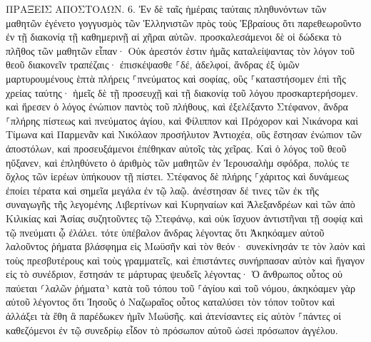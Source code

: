 \documentclass[twoside, 9pt]{extreport}
\begin{document}
ΠΡΑΞΕΙΣ ΑΠΟΣΤΟΛΩΝ.
6.
Ἐν δὲ ταῖς ἡμέραις ταύταις πληθυνόντων τῶν μαθητῶν ἐγένετο γογγυσμὸς τῶν Ἑλληνιστῶν πρὸς τοὺς Ἑβραίους ὅτι παρεθεωροῦντο ἐν τῇ διακονίᾳ τῇ καθημερινῇ αἱ χῆραι αὐτῶν. 
προσκαλεσάμενοι δὲ οἱ δώδεκα τὸ πλῆθος τῶν μαθητῶν εἶπαν· Οὐκ ἀρεστόν ἐστιν ἡμᾶς καταλείψαντας τὸν λόγον τοῦ θεοῦ διακονεῖν τραπέζαις· 
ἐπισκέψασθε ⸀δέ, ἀδελφοί, ἄνδρας ἐξ ὑμῶν μαρτυρουμένους ἑπτὰ πλήρεις ⸀πνεύματος καὶ σοφίας, οὓς ⸀καταστήσομεν ἐπὶ τῆς χρείας ταύτης· 
ἡμεῖς δὲ τῇ προσευχῇ καὶ τῇ διακονίᾳ τοῦ λόγου προσκαρτερήσομεν. 
καὶ ἤρεσεν ὁ λόγος ἐνώπιον παντὸς τοῦ πλήθους, καὶ ἐξελέξαντο Στέφανον, ἄνδρα ⸀πλήρης πίστεως καὶ πνεύματος ἁγίου, καὶ Φίλιππον καὶ Πρόχορον καὶ Νικάνορα καὶ Τίμωνα καὶ Παρμενᾶν καὶ Νικόλαον προσήλυτον Ἀντιοχέα, 
οὓς ἔστησαν ἐνώπιον τῶν ἀποστόλων, καὶ προσευξάμενοι ἐπέθηκαν αὐτοῖς τὰς χεῖρας. 
Καὶ ὁ λόγος τοῦ θεοῦ ηὔξανεν, καὶ ἐπληθύνετο ὁ ἀριθμὸς τῶν μαθητῶν ἐν Ἰερουσαλὴμ σφόδρα, πολύς τε ὄχλος τῶν ἱερέων ὑπήκουον τῇ πίστει. 
Στέφανος δὲ πλήρης ⸀χάριτος καὶ δυνάμεως ἐποίει τέρατα καὶ σημεῖα μεγάλα ἐν τῷ λαῷ. 
ἀνέστησαν δέ τινες τῶν ἐκ τῆς συναγωγῆς τῆς λεγομένης Λιβερτίνων καὶ Κυρηναίων καὶ Ἀλεξανδρέων καὶ τῶν ἀπὸ Κιλικίας καὶ Ἀσίας συζητοῦντες τῷ Στεφάνῳ, 
καὶ οὐκ ἴσχυον ἀντιστῆναι τῇ σοφίᾳ καὶ τῷ πνεύματι ᾧ ἐλάλει. 
τότε ὑπέβαλον ἄνδρας λέγοντας ὅτι Ἀκηκόαμεν αὐτοῦ λαλοῦντος ῥήματα βλάσφημα εἰς Μωϋσῆν καὶ τὸν θεόν· 
συνεκίνησάν τε τὸν λαὸν καὶ τοὺς πρεσβυτέρους καὶ τοὺς γραμματεῖς, καὶ ἐπιστάντες συνήρπασαν αὐτὸν καὶ ἤγαγον εἰς τὸ συνέδριον, 
ἔστησάν τε μάρτυρας ψευδεῖς λέγοντας· Ὁ ἄνθρωπος οὗτος οὐ παύεται ⸂λαλῶν ῥήματα⸃ κατὰ τοῦ τόπου τοῦ ⸀ἁγίου καὶ τοῦ νόμου, 
ἀκηκόαμεν γὰρ αὐτοῦ λέγοντος ὅτι Ἰησοῦς ὁ Ναζωραῖος οὗτος καταλύσει τὸν τόπον τοῦτον καὶ ἀλλάξει τὰ ἔθη ἃ παρέδωκεν ἡμῖν Μωϋσῆς. 
καὶ ἀτενίσαντες εἰς αὐτὸν ⸀πάντες οἱ καθεζόμενοι ἐν τῷ συνεδρίῳ εἶδον τὸ πρόσωπον αὐτοῦ ὡσεὶ πρόσωπον ἀγγέλου. 
\end{document}

